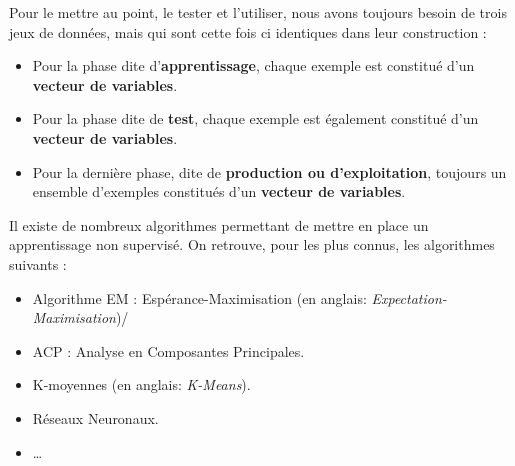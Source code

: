 Pour le mettre au point, le tester et l'utiliser, nous avons toujours besoin de trois jeux de données, mais qui sont cette fois ci identiques dans leur construction :

\begin{itemize}
	\item Pour la phase dite d'\textbf{apprentissage}, chaque exemple est constitué d'un \textbf{vecteur de variables}.\\
	
	\item Pour la phase dite de \textbf{test}, chaque exemple est également constitué d'un \textbf{vecteur de variables}.\\
	
	\item Pour la dernière phase, dite de \textbf{production ou d'exploitation}, toujours un ensemble d'exemples constitués d'un \textbf{vecteur de variables}.

\end{itemize}
\vspace{3mm}


Il existe de nombreux algorithmes permettant de mettre en place un apprentissage non supervisé. On retrouve, pour les plus connus, les algorithmes suivants : 

\begin{itemize}
	\item Algorithme EM : Espérance-Maximisation (en anglais: \textit{Expectation-Maximisation})/\\
	
	\item ACP : Analyse en Composantes Principales.\\
	
	\item K-moyennes (en anglais: \textit{K-Means}).\\
	
	\item Réseaux Neuronaux.\\
	
	\item  \ldots
	
\end{itemize}